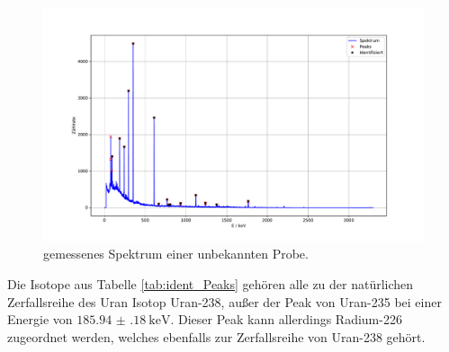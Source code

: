 \begin{figure}
  \centering
  \caption{gemessenes Spektrum einer unbekannten Probe.}
  \label{fig:Peaks_04}
  \includegraphics[width=\textwidth,keepaspectratio]{figure/04_peaks.pdf}
\end{figure}
\FloatBarrier
Die Isotope aus Tabelle \ref{tab:ident_Peaks} gehören alle zu der natürlichen Zerfallsreihe des Uran Isotop Uran-238, 
außer der Peak von Uran-235 bei einer Energie von $\SI{185.94(18)}{\kilo\eV}$.
Dieser Peak kann allerdings Radium-226 zugeordnet werden, welches ebenfalls zur Zerfallsreihe von Uran-238 gehört.









